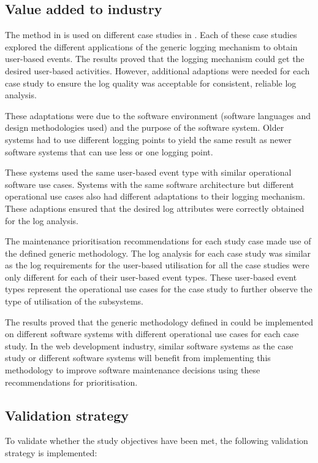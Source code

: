 \subsection{Value added to industry}
The method in  is used on different case studies in . Each of
these case studies explored the different applications of the generic logging mechanism to obtain
user-based events. The results proved that the logging mechanism could get the desired user-based
activities. However, additional adaptions were needed for each case study to ensure the log quality
was acceptable for consistent, reliable log analysis.\par These adaptations were due to the software
environment (software languages and design methodologies used) and the purpose of the software
system. Older systems had to use different logging points to yield the same result as newer software
systems that can use less or one logging point.\par These systems used the same user-based event
type with similar operational software use cases. Systems with the same software architecture but
different operational use cases also had different adaptations to their logging mechanism. These
adaptions ensured that the desired log attributes were correctly obtained for the log analysis. \par
The maintenance prioritisation recommendations for each study case made use of the defined generic
methodology. The log analysis for each case study was similar as the log requirements for the
user-based utilisation for all the case studies were only different for each of their user-based
event types. These user-based event types represent the operational use cases for the case study to
further observe the type of utilisation of the subsystems. \par The results proved that the generic
methodology defined in  could be implemented on different software systems with
different operational use cases for each case study. In the web development industry, similar
software systems as the case study or different software systems will benefit from implementing this
methodology to improve software maintenance decisions using these recommendations for
prioritisation.

\subsection{Validation strategy}
To validate whether the study objectives have been met, the following validation strategy is
implemented:

